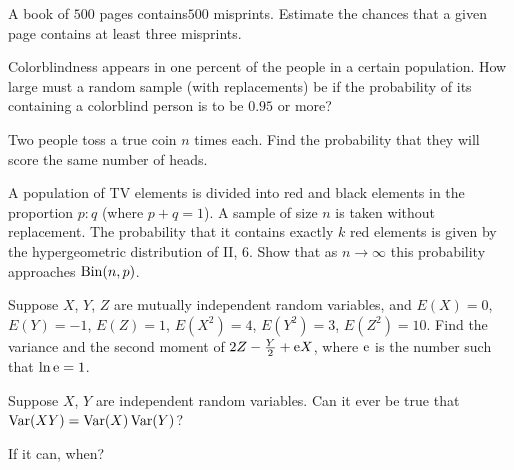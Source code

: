 \begin{problem}[Handout 8, \# 13]
  A book of \(\num{500}\) pages contains\(\num{500}\) misprints. Estimate
  the chances that a given page contains at least three misprints.
\end{problem}
\begin{solution}
\end{solution}


\begin{problem}[Handout 8, \# 14]
  Colorblindness appears in one percent of the people in a certain
  population. How large must a random sample (with replacements) be if the
  probability of its containing a colorblind person is to be \(0.95\) or
  more?
\end{problem}
\begin{solution}
\end{solution}

\begin{problem}[Handout 8, \# 15]
  Two people toss a true coin \(n\) times each. Find the probability that
  they will score the same number of heads.
\end{problem}
\begin{solution}
\end{solution}

\begin{problem}
  A population of TV elements is divided into red and black elements in the
  proportion \(p:q\) (where \(p+q=1\)). A sample of size \(n\) is taken
  without replacement. The probability that it contains exactly \(k\) red
  elements is given by the hypergeometric distribution of II, 6. Show that
  as \(n\to\infty\) this probability approaches \(\operatorname{Bin}(n,p)\).
\end{problem}
\begin{solution}
\end{solution}

\begin{problem}[Handout 9, \# 3]
  Suppose \(X\), \(Y\), \(Z\) are mutually independent random variables,
  and \(E(X)=0\), \(E(Y)=-1\), \(E(Z)=1\), \(E(X^2)=4\), \(E(Y^2)=3\),
  \(E(Z^2)=10\). Find the variance and the second moment of
  \(2Z-\frac{Y}{2}+\mathrm{e} X\), where \(\mathrm{e}\) is the number such that
  \(\ln \mathrm{e}=1\).
\end{problem}
\begin{solution}
\end{solution}

\begin{problem}
  Suppose \(X\), \(Y\) are independent random variables. Can it ever be
  true that \(\operatorname{Var}(XY)=\operatorname{Var}(X)\operatorname{Var}(Y)\)?

  \noindent If it can, when?
\end{problem}
\begin{solution}
\end{solution}

